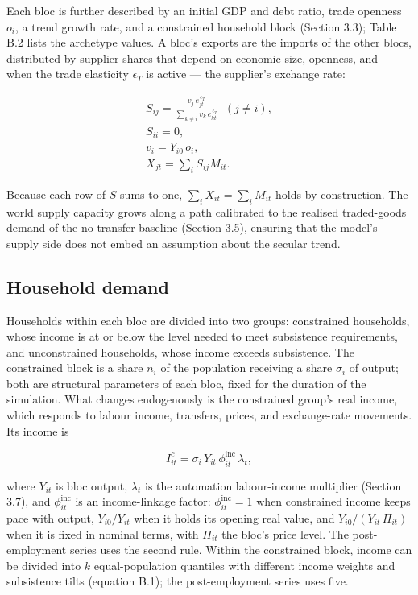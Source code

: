 \documentclass[preprint,review,12pt]{elsarticle}
\begin{document}
Each bloc is further described by an initial GDP and debt ratio, trade
openness \(o_i\), a trend growth rate, and a constrained household block
(Section 3.3); Table B.2 lists the archetype values. A bloc's exports
are the imports of the other blocs, distributed by supplier shares that
depend on economic size, openness, and --- when the trade elasticity
\(\epsilon_T\) is active --- the supplier's exchange rate:

\[\begin{gathered} S_{ij} = \frac{v_j \, e_{jt}^{\,\epsilon_T}}{\sum_{k \neq i} v_k \, e_{kt}^{\,\epsilon_T}} \;\; (j \neq i), \\ S_{ii} = 0, \\ v_i = Y_{i0} \, o_i, \\ X_{jt} = \sum_i S_{ij} M_{it}. \end{gathered} \tag{3}\]

Because each row of \(S\) sums to one, \(\sum_i X_{it} = \sum_i M_{it}\)
holds by construction. The world supply capacity grows along a path
calibrated to the realised traded-goods demand of the no-transfer
baseline (Section 3.5), ensuring that the model's supply side does not
embed an assumption about the secular trend.

\subsection{Household demand}

Households within each bloc are divided into two groups: constrained
households, whose income is at or below the level needed to meet
subsistence requirements, and unconstrained households, whose income
exceeds subsistence. The constrained block is a share \(n_i\) of the
population receiving a share \(\sigma_i\) of output; both are structural
parameters of each bloc, fixed for the duration of the simulation. What
changes endogenously is the constrained group's real income, which
responds to labour income, transfers, prices, and exchange-rate
movements. Its income is

\[I^c_{it} = \sigma_i \, Y_{it} \, \phi^{\mathrm{inc}}_{it} \, \lambda_t, \tag{4}\]

where \(Y_{it}\) is bloc output, \(\lambda_t\) is the automation
labour-income multiplier (Section 3.7), and \(\phi^{\mathrm{inc}}_{it}\)
is an income-linkage factor: \(\phi^{\mathrm{inc}}_{it} = 1\) when
constrained income keeps pace with output, \(Y_{i0}/Y_{it}\) when it
holds its opening real value, and \(Y_{i0}/(Y_{it}\,\Pi_{it})\) when it
is fixed in nominal terms, with \(\Pi_{it}\) the bloc's price level. The
post-employment series uses the second rule. Within the constrained
block, income can be divided into \(k\) equal-population quantiles with
different income weights and subsistence tilts (equation B.1); the
post-employment series uses five.
\end{document}

